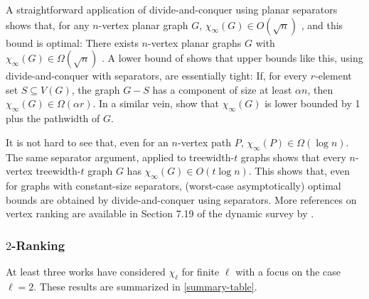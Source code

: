 \documentclass[kpfonts]{patmorin}
\theoremstyle{named}
\begin{document}
A straightforward application of divide-and-conquer using planar separators shows that, for any $n$-vertex planar graph $G$, $\chi_\infty(G) \in O(\sqrt{n})$ \cite{llewellyn.tovey.ea:local,katchalski.mccuaig.ea:ordered}, and this bound is optimal:  There exists $n$-vertex planar graphs $G$ with $\chi_\infty(G)\in \Omega(\sqrt{n})$ \cite{katchalski.mccuaig.ea:ordered}.  A lower bound of \citet{katchalski.mccuaig.ea:ordered} shows that upper bounds like this, using divide-and-conquer with separators, are essentially tight: If, for every $r$-element set $S\subseteq V(G)$, the graph $G-S$ has a component of size at least $\alpha n$, then $\chi_\infty(G) \in\Omega(\alpha r)$. In a similar vein, \citet{bodlaender.gilbert.ea:approximating,kloks:treewidth} show that $\chi_\infty(G)$ is lower bounded by 1 plus the pathwidth of $G$.

It is not hard to see that, even for an $n$-vertex path $P$, $\chi_\infty(P)\in\Omega(\log n)$.  The same separator argument, applied to treewidth-$t$ graphs shows that every $n$-vertex treewidth-$t$ graph $G$ has $\chi_\infty(G)\in O(t\log n)$.  This shows that, even for graphs with constant-size separators, (worst-case asymptotically) optimal bounds are obtained by divide-and-conquer using separators.  More references on vertex ranking are available in Section 7.19 of the dynamic survey by \citet{gallian:dynamic}.

\subsubsection{$2$-Ranking}

At least three works have considered $\chi_\ell$ for finite $\ell$ with a focus on the case $\ell=2$.  These results are summarized in \cref{summary-table}.
\end{document}
